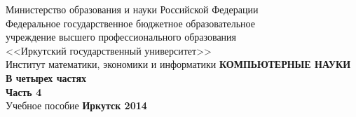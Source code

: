 \documentclass[a4paper,14pt, openany, twoside, draft]{extbook} %
\newcommand{\aaa}[2][acolor]{\noindent\textcolor{eclr}%
{+\ [}\textcolor{#1}{#2}\textcolor{eclr}{]}}
\begin{document}

\renewcommand{\chaptername}{} %
\renewcommand{\refname}{Рекомендуемая литература} %
\renewcommand{\bibname}{\refname}
\begin{titlepage}
\thispagestyle{empty}
\begin{center}{\small{}
Министерство образования и науки
Российской Федерации \\
Федеральное государственное бюджетное образовательное\\
учреждение высшего профессионального образования\\
<<Иркутский государственный университет>> \\
Институт математики, экономики и информатики
}
\vfill
 \vspace{2em}
{\large\bfseries КОМПЬЮТЕРНЫЕ НАУКИ\\В четырех частях\\Часть 4\\}
 \vspace{2em}
{Учебное пособие}
\vfill
\vfill
 \textbf{Иркутск 2014}
\end{center}
\end{titlepage}
\end{document}
